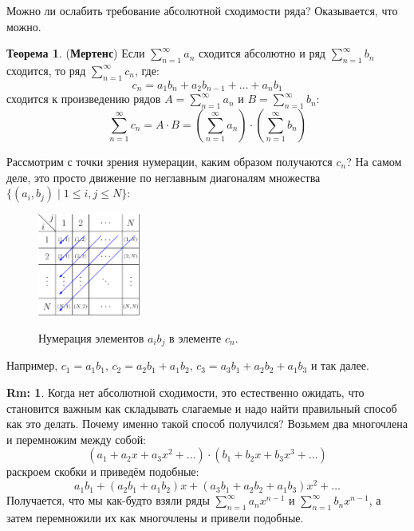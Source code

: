 \documentclass[12pt]{article}
\theoremstyle{definition}
\newtheorem{rem}{Rm:}
\newtheorem{theorem}{Теорема}
\DeclareMathOperator*{\dsum}{\displaystyle\sum}
\begin{document}
Можно ли ослабить требование абсолютной сходимости ряда? Оказывается, что можно.
\begin{theorem}(\textbf{Мертенс})
	Если $\dsum\limits_{n = 1}^{\infty} a_n$ сходится абсолютно и ряд $\dsum\limits_{n = 1}^{\infty} b_n$ сходится, то ряд $\dsum\limits_{n = 1}^{\infty} c_n$, где:
	$$
		c_n = a_1 b_n + a_2 b_{n-1} + \dotsc + a_n b_1
	$$ 
	сходится к произведению рядов $A = \dsum\limits_{n = 1}^{\infty} a_n$ и $B = \dsum\limits_{n = 1}^{\infty} b_n$:
	$$
		\dsum\limits_{n = 1}^{\infty} c_n  = A{\cdot}B = \left(\dsum\limits_{n = 1}^{\infty} a_n\right){\cdot}\left(\dsum\limits_{n = 1}^{\infty} b_n\right)
	$$
\end{theorem}

Рассмотрим с точки зрения нумерации, каким образом получаются $c_n$? На самом деле, это просто движение по неглавным диагоналям множества $\{(a_i, b_j) \mid 1 \leq i,j \leq N\}$: 
\begin{figure}[H]
	\centering
	\includegraphics[width=0.3\textwidth]{MA3L5_2.eps}
	\label{5_2}
	\caption{Нумерация элементов $a_i b_j$ в элементе $c_n$.}
	\label{fig:Нумерация}
\end{figure}
Например, $c_1 = a_1 b_1, \, c_2 = a_2 b_1 + a_1 b_2, \, c_3 = a_3 b_1 + a_2 b_2 + a_1 b_3$ и так далее.
\begin{rem}
	Когда нет абсолютной сходимости, это естественно ожидать, что становится важным как складывать слагаемые и надо найти правильный способ как это делать. Почему именно такой способ получился? Возьмем два многочлена и перемножим между собой:
	$$
		(a_1 + a_2x + a_3 x^2 + \dotsc){\cdot}(b_1 + b_2 x + b_3 x^3 + \dotsc)
	$$
	раскроем скобки и приведём подобные:
	$$
		a_1 b_1 + (a_2 b_1 + a_1 b_2) x + (a_3 b_1 + a_2 b_2 + a_1 b_3)x^2  + \dotsc
	$$
	Получается, что мы как-будто взяли ряды $\dsum\limits_{n = 1}^{\infty} a_n x^{n-1}$ и $\dsum\limits_{n = 1}^{\infty} b_n x^{n-1}$, а затем перемножили их как многочлены и привели подобные.
\end{rem}
\end{document}
